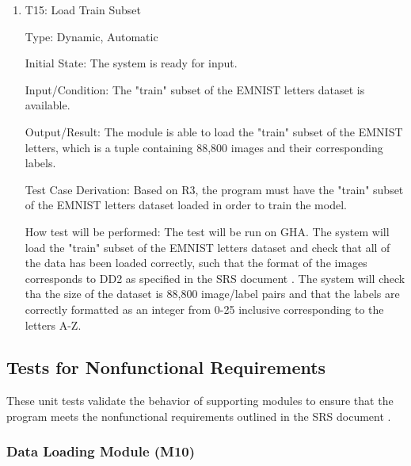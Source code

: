 \documentclass[12pt, titlepage]{article}
\begin{document}
\begin{enumerate}

\item{T15: Load Train Subset\\}

Type: Dynamic, Automatic

Initial State: The \progname{} system is ready for input.

Input/Condition: The "train" subset of the EMNIST letters dataset is available.

Output/Result: The module is able to load the "train" subset of the EMNIST
letters, which is a tuple containing 88,800 images and their corresponding
labels.

Test Case Derivation: Based on R3, the program must have the "train" subset
of the EMNIST letters dataset loaded in order to train the model.

How test will be performed: The test will be run on GHA. The system will load the
"train" subset of the EMNIST letters dataset and check that all of the
data has been loaded correctly, such that the format of the images corresponds
to DD2 as specified in the SRS document \citep{SRS}. The system will check tha
the size of the dataset is 88,800 image/label pairs and that the labels are
correctly formatted as an integer from 0-25 inclusive corresponding to the
letters A-Z.

\end{enumerate}

\subsection{Tests for Nonfunctional Requirements}

These unit tests validate the behavior of supporting modules to ensure that the
\progname{} program meets the nonfunctional requirements outlined in the SRS
document \citep{SRS}.




\subsubsection{Data Loading Module (M10)}
\end{document}
